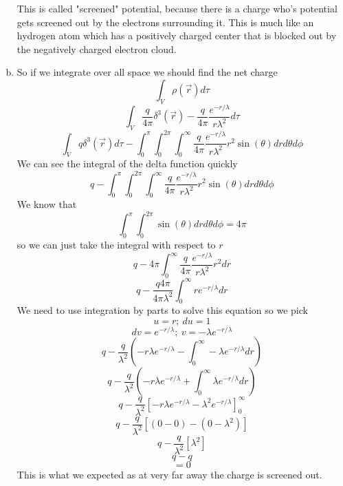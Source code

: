 \documentclass[11pt]{article}
\numberwithin{equation}{section}
\begin{document}
\begin{enumerate}[(a)]
This is called "screened" potential, because there is a charge who's potential gets screened out by the electrons surrounding it. This is much like an hydrogen atom which has a positively charged center that is blocked out by the negatively charged electron cloud. 
\item
So if we integrate over all space we should find the net charge
$$\int_V \rho(\vec{r}) d\tau$$
$$\int_V \frac{q}{4\pi}\delta^3(\vec{r}) - \frac{q}{4\pi}\frac{e^{-r/\lambda}}{r\lambda^2}d\tau$$
$$ \int_V q\delta^3(\vec{r})d\tau - \int_0^{\pi}\int_0^{2\pi}\int_0^{\infty}\frac{q}{4\pi}\frac{e^{-r/\lambda}}{r\lambda^2}r^2\sin(\theta)drd\theta d\phi$$
We can see the integral of the delta function quickly
$$q- \int_0^{\pi}\int_0^{2\pi}\int_0^{\infty}\frac{q}{4\pi}\frac{e^{-r/\lambda}}{r\lambda^2}r^2\sin(\theta)drd\theta d\phi$$
We know that 
$$\int_0^{\pi}\int_0^{2\pi}\sin(\theta)drd\theta d\phi = 4\pi$$
so we can just take the integral with respect to $r$
$$q- 4\pi\int_0^{\infty}\frac{q}{4\pi}\frac{e^{-r/\lambda}}{r\lambda^2}r^2dr$$
$$q- \frac{q4\pi}{4\pi\lambda^2}\int_0^{\infty}r e^{-r/\lambda}dr$$
We need to use integration by parts to solve this equation so we pick
$$u = r;\ du=1$$
$$dv = e^{-r/\lambda};\ v = -\lambda e^{-r/\lambda}$$
$$q- \frac{q}{\lambda^2}\left(-r\lambda e^{-r/\lambda} - \int_0^{\infty}-\lambda e^{-r/\lambda}dr\right)$$
$$q- \frac{q}{\lambda^2}\left(-r\lambda e^{-r/\lambda} + \int_0^{\infty}\lambda e^{-r/\lambda}dr\right)$$
$$q- \frac{q}{\lambda^2}\left[-r\lambda e^{-r/\lambda} - \lambda^2 e^{-r/\lambda}\right]_0^{\infty}$$
$$q- \frac{q}{\lambda^2}\left[(0-0) - (0 -\lambda^2)\right]$$
$$q- \frac{q}{\lambda^2}\left[\lambda^2\right]$$
$$q- q$$
$$=0$$
This is what we expected as at very far away the charge is screened out.


\end{enumerate}
\end{document}
